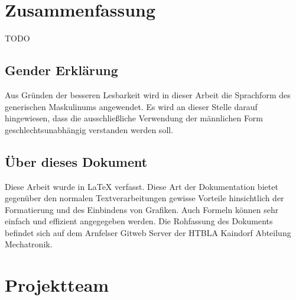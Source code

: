 \section*{Zusammenfassung}
TODO

\clearpage

\newpage
\thispagestyle{empty}
\mbox{}

\clearpage

\subsection*{Gender Erklärung}
\label{sec:gender-erklaerung}
Aus Gründen der besseren Lesbarkeit wird in dieser Arbeit die Sprachform des generischen Maskulinums angewendet. Es wird an dieser Stelle darauf hingewiesen, dass die ausschließliche Verwendung der männlichen Form geschlechtsunabhängig verstanden werden soll.

\subsection*{Über dieses Dokument}
\label{sec:ueber-dokument}
Diese Arbeit wurde in \LaTeX{} verfasst. Diese Art der Dokumentation bietet gegenüber den normalen Textverarbeitungen gewisse Vorteile hinsichtlich der Formatierung und des Einbindens von Grafiken. Auch Formeln können sehr einfach und effizient angegegeben werden. Die Rohfassung des Dokuments befindet sich auf dem Arnfelser Gitweb Server der HTBLA Kaindorf Abteilung Mechatronik.

\clearpage

\newpage
\thispagestyle{empty}
\mbox{}

\clearpage

\section*{Projektteam}
\label{sec:projektteam}

